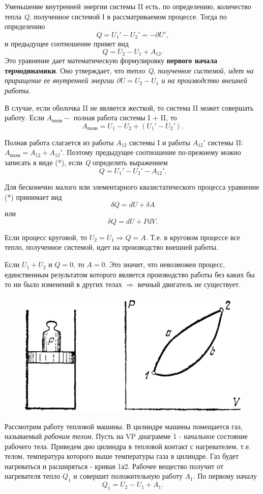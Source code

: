 \documentclass[14pt,a4paper]{scrartcl}
\begin{document}
		\quad Уменьшение внутренней энергии системы II есть, по определению, количество тепла \textit{Q}, полученное системой I в рассматриваемом процессе. Тогда по определению $$Q = U_1' - U_2' = -\partial U',$$ и предыдущее соотношение примет вид \begin{equation}\label{*} Q = U_2 -U_1 + A_{12}. \end{equation}
		Это уравнение дает математическую формулировку \textbf{первого начала термодинамики}. Оно утверждает, что\textit{ тепло Q, полученное системой, идет на приращение ее внутренней энергии $\partial U = U_2 -U_1$ и на производство внешней работы.}
		
		\quad В случае, если оболочка II не является жесткой, то система II может совершать работу. Если $A_{\text{полн}}-$ полная работа системы I + II, то $$A_{\text{полн}} = U_1 - U_2 + (U_1' -U_2').$$
		
		\quad Полная работа слагается из работы $A_{12}$ системы I и работы $A_{12}'$ системы II: $A_{\text{полн}} = A_{12} +A_{12}'$. Поэтому предыдущее соотношение по-прежнему можно записать в виде (*), если \textit{Q} определить выражением $$Q = U_1' - U_2' - A_{12}'.$$
		
		\quad Для бесконечно малого или элементарного квазистатического процесса уравнение (*) принимает вид $$\delta Q = dU +\delta A$$ или $$\delta Q = dU + PdV.$$ 
		
		\quad Если процесс круговой, то $U_2 = U_1 \Rightarrow Q = A$. Т.е. в круговом процессе все тепло, полученное системой, идет на производство внешней работы.
		
		\quad Если $U_1 + U_2$ и $Q = 0$, то $A = 0$. Это значит, что невозможен процесс, единственным результатом которого является производство работы без каких бы то ни было изменений в других телах $\Rightarrow$ вечный двигатель не существует.\\
		
		\begin{figure} 
			\includegraphics[width=\linewidth]{warm_machine.png}
		\end{figure}
		\quad Рассмотрим работу тепловой машины. В цилиндре машины помещается газ, называемый \textit{рабочим телом}. Пусть на VP диаграмме  1 - начальное состояние рабочего тела. Приведем дно цилиндра в тепловой контакт с нагревателем, т.е. телом, температура которого выше температуры газа в цилиндре. Газ будет нагреваться и расширяться - кривая 1а2. Рабочее вещество получит от нагревателя тепло $Q_1$ и совершит положительную работу $A_1$. По первому началу $$Q_1  = U_2-U_1+A_1.$$
		
\end{document}
